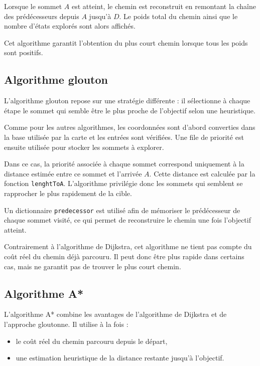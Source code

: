 \documentclass[a4paper,12pt]{article}
\begin{document}
Lorsque le sommet $A$ est atteint, le chemin est reconstruit en remontant la chaîne des prédécesseurs depuis $A$ jusqu’à $D$. Le poids total du chemin ainsi que le nombre d’états explorés sont alors affichés.

Cet algorithme garantit l’obtention du plus court chemin lorsque tous les poids sont positifs.


\subsection{Algorithme glouton}

L’algorithme glouton repose sur une stratégie différente : il sélectionne à chaque étape le sommet qui semble être le plus proche de l’objectif selon une heuristique.

Comme pour les autres algorithmes, les coordonnées sont d’abord converties dans la base utilisée par la carte et les entrées sont vérifiées. Une file de priorité est ensuite utilisée pour stocker les sommets à explorer.

Dans ce cas, la priorité associée à chaque sommet correspond uniquement à la distance estimée entre ce sommet et l’arrivée $A$. Cette distance est calculée par la fonction \texttt{lenghtToA}. L’algorithme privilégie donc les sommets qui semblent se rapprocher le plus rapidement de la cible.

Un dictionnaire \texttt{predecessor} est utilisé afin de mémoriser le prédécesseur de chaque sommet visité, ce qui permet de reconstruire le chemin une fois l’objectif atteint.

Contrairement à l’algorithme de Dijkstra, cet algorithme ne tient pas compte du coût réel du chemin déjà parcouru. Il peut donc être plus rapide dans certains cas, mais ne garantit pas de trouver le plus court chemin.


\subsection{Algorithme A*}

L’algorithme A* combine les avantages de l’algorithme de Dijkstra et de l’approche gloutonne. Il utilise à la fois :
\begin{itemize}
\item le coût réel du chemin parcouru depuis le départ,
\item une estimation heuristique de la distance restante jusqu’à l’objectif.
\end{itemize}
\end{document}
